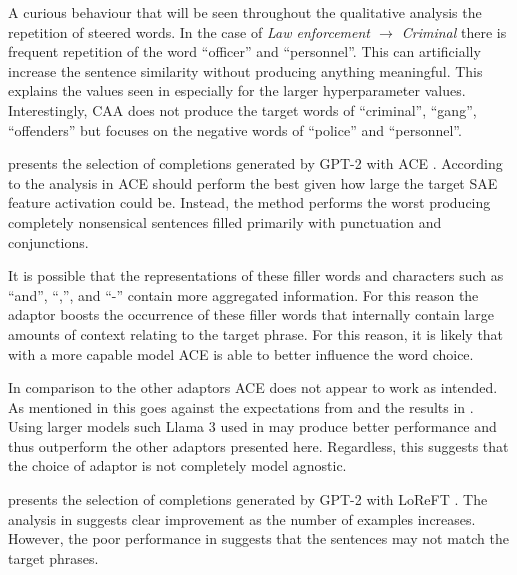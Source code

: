 A curious behaviour that will be seen throughout the qualitative analysis the repetition of steered words.
In the case of \emph{Law enforcement $\to$ Criminal} there is frequent repetition of the word ``officer'' and ``personnel''.
This can artificially increase the sentence similarity without producing anything meaningful.
This explains the values seen in  especially for the larger hyperparameter values.
Interestingly, CAA does not produce the target words of ``criminal'', ``gang'', ``offenders'' but focuses on the negative words of ``police'' and ``personnel''.




 presents the selection of completions generated by GPT-2 with ACE \citep{ace}.
According to the analysis in  ACE should perform the best given how large the target SAE feature activation could be.
Instead, the method performs the worst producing completely nonsensical sentences filled primarily with punctuation and conjunctions.

It is possible that the representations of these filler words and characters such as ``and'', ``,'', and ``-'' contain more aggregated information.
For this reason the adaptor boosts the occurrence of these filler words that internally contain large amounts of context relating to the target phrase.
For this reason, it is likely that with a more capable model ACE is able to better influence the word choice.

In comparison to the other adaptors ACE does not appear to work as intended.
As mentioned in  this goes against the expectations from \citet{ace} and the results in .
Using larger models such Llama 3 \citep{llama3} used in \citet{ace} may produce better performance and thus outperform the other adaptors presented here.
Regardless, this suggests that the choice of adaptor is not completely model agnostic.




 presents the selection of completions generated by GPT-2 with LoReFT \citep{reft}.
The analysis in  suggests clear improvement as the number of examples increases.
However, the poor performance in  suggests that the sentences may not match the target phrases.

